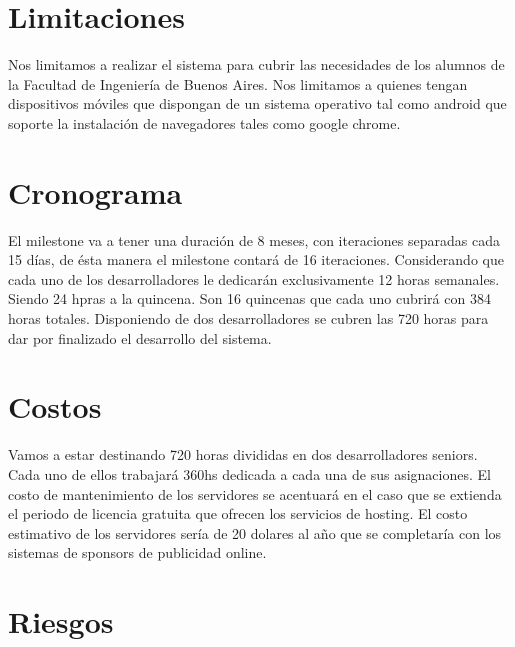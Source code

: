 \documentclass[a4paper,11pt]{article}
\begin{document}
\section{Limitaciones}

  Nos limitamos a realizar el sistema para cubrir las necesidades de los
  alumnos de la Facultad de Ingeniería de Buenos Aires.  Nos limitamos a
  quienes tengan dispositivos móviles que dispongan de un sistema operativo tal
  como android que soporte la instalación de navegadores tales como google
  chrome.

\section{Cronograma}

  El milestone va a tener una duración de 8 meses, con iteraciones separadas
  cada 15 días, de ésta manera el milestone contará de 16 iteraciones.
  Considerando que cada uno de los desarrolladores le dedicarán exclusivamente
  12 horas semanales. Siendo 24 hpras a la quincena. Son 16 quincenas que cada
  uno cubrirá con 384 horas totales. Disponiendo de dos desarrolladores se
  cubren las 720 horas para dar por finalizado el desarrollo del sistema.

\section{Costos}

  Vamos a estar destinando 720 horas divididas en dos desarrolladores seniors.
  Cada uno de ellos trabajará 360hs dedicada a cada una de sus asignaciones.
  El costo de mantenimiento de los servidores se acentuará en el caso que se
  extienda el periodo de licencia gratuita que ofrecen los servicios de
  hosting.  El costo estimativo de los servidores sería de 20 dolares al año
  que se completaría con los sistemas de sponsors de publicidad online.


\section{Riesgos}
\end{document}
